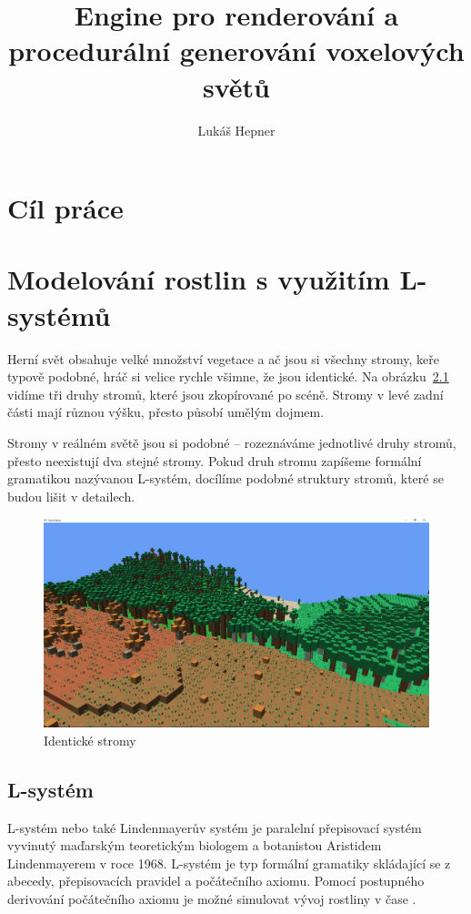 \documentclass[thesis=M,czech]{FITthesis}[2019/12/23]
\title{Engine pro renderování a procedurální generování voxelových světů}
\author{Lukáš Hepner} %
\begin{document}

\begin{introduction}
\end{introduction}

\chapter{Cíl práce}

\chapter{Modelování rostlin s využitím L-systémů}
Herní svět obsahuje velké množství vegetace a ač jsou si všechny stromy, keře typově podobné, hráč si velice rychle všimne, že jsou identické. Na obrázku~\ref{fig:identicke_stromy} vidíme tři druhy stromů, které jsou zkopírované po scéně. Stromy v levé zadní části mají různou výšku, přesto působí umělým dojmem.

Stromy v reálném světě jsou si podobné -- rozeznáváme jednotlivé druhy stromů, přesto neexistují dva stejné stromy. Pokud druh stromu zapíšeme formální gramatikou nazývanou L-systém, docílíme podobné struktury stromů, které se budou lišit v detailech.

\begin{figure}\centering
	\includegraphics[width=\textwidth]{images/identical_trees}
	\caption[Identické stromy]{Identické stromy}\label{fig:identicke_stromy}
\end{figure}

\section{L-systém}
L-systém nebo také Lindenmayerův systém je paralelní přepisovací systém vyvinutý maďarským teoretickým biologem a botanistou Aristidem Lindenmayerem v roce 1968. L-systém je typ formální gramatiky skládající se z abecedy, přepisovacích pravidel a počátečního axiomu. Pomocí postupného derivování počátečního axiomu je možné simulovat vývoj rostliny v čase \cite{pcgbook75}.
\end{document}
